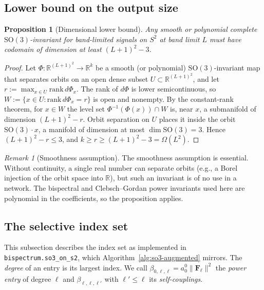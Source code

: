 \documentclass{article}
\newtheorem{proposition}[theorem]{Proposition}
\theoremstyle{definition}
\theoremstyle{remark}
\newtheorem{remark}[theorem]{Remark}
\newcommand{\R}{\mathbb{R}}
\newcommand{\SO}{\mathrm{SO}}
\theoremstyle{definition}
\begin{document}
\subsection{Lower bound on the output size}
\label{sec:app-lower-bound}

\begin{proposition}[Dimensional lower bound]\label{prop:app-lower-bound}
Any \emph{smooth or polynomial} complete $\SO(3)$-invariant for
band-limited signals on $S^2$ at band limit $L$ must have codomain
of dimension at least $(L+1)^2 - 3$.
\end{proposition}
\begin{proof}
Let $\Phi : \R^{(L+1)^2} \to \R^k$ be a smooth (or polynomial) $\SO(3)$-invariant map that
separates orbits on an open dense subset $U\subset\R^{(L+1)^2}$, and let
$r := \max_{x\in U} \mathrm{rank}\, d\Phi_x$. The rank of $d\Phi$ is lower semicontinuous,
so $W := \{x\in U : \mathrm{rank}\, d\Phi_x = r\}$ is open and nonempty. By the constant-rank
theorem, for $x\in W$ the level set $\Phi^{-1}(\Phi(x))\cap W$ is, near $x$, a submanifold of
dimension $(L+1)^2 - r$. Orbit separation on $U$ places it inside the orbit $\SO(3)\cdot x$,
a manifold of dimension at most $\dim\SO(3) = 3$. Hence $(L+1)^2 - r \le 3$, and
$k \ge r \ge (L+1)^2 - 3 = \Omega(L^2)$.
\end{proof}

\begin{remark}[Smoothness assumption]
The smoothness assumption is essential. Without continuity, a single real number can separate
orbits (e.g., a Borel injection of the orbit space into $\R$), but such an invariant is of no use
in a network. The bispectral and Clebsch--Gordan power invariants used here are polynomial in
the coefficients, so the proposition applies.
\end{remark}

\subsection{The selective index set}
\label{sec:app-selective-index}

This subsection describes the index set as implemented in \texttt{bispectrum.so3\_on\_s2}, which
Algorithm~\ref{alg:so3-augmented} mirrors. The \emph{degree}
of an entry is its largest index. We call
$\beta_{0,\ell,\ell}=a_0^0\lVert\mathbf{F}_\ell\rVert^2$ the \emph{power entry} of degree
$\ell$ and $\beta_{\ell,\ell,\ell'}$ with $\ell'\le\ell$ its \emph{self-couplings}.
\end{document}
